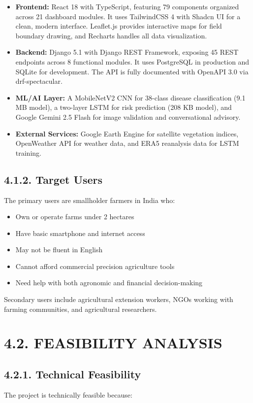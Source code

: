 \documentclass[12pt, a4paper]{report}
\begin{document}
\begin{itemize}[leftmargin=*]
  \item \textbf{Frontend:} React 18 with TypeScript, featuring 79 components organized across 21 dashboard modules. It uses TailwindCSS 4 with Shadcn UI for a clean, modern interface. Leaflet.js provides interactive maps for field boundary drawing, and Recharts handles all data visualization.
  \item \textbf{Backend:} Django 5.1 with Django REST Framework, exposing 45 REST endpoints across 8 functional modules. It uses PostgreSQL in production and SQLite for development. The API is fully documented with OpenAPI 3.0 via drf-spectacular.
  \item \textbf{ML/AI Layer:} A MobileNetV2 CNN for 38-class disease classification (9.1 MB model), a two-layer LSTM for risk prediction (208 KB model), and Google Gemini 2.5 Flash for image validation and conversational advisory.
  \item \textbf{External Services:} Google Earth Engine for satellite vegetation indices, OpenWeather API for weather data, and ERA5 reanalysis data for LSTM training.
\end{itemize}
\subsection{4.1.2. Target Users}
The primary users are smallholder farmers in India who:

\begin{itemize}[leftmargin=*]
  \item Own or operate farms under 2 hectares
  \item Have basic smartphone and internet access
  \item May not be fluent in English
  \item Cannot afford commercial precision agriculture tools
  \item Need help with both agronomic and financial decision-making
\end{itemize}
Secondary users include agricultural extension workers, NGOs working with farming communities, and agricultural researchers.

\section{4.2. FEASIBILITY ANALYSIS}
\subsection{4.2.1. Technical Feasibility}
The project is technically feasible because:
\end{document}
